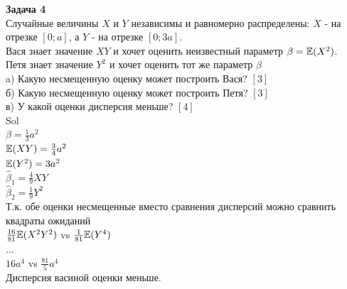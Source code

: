 \documentclass[12pt, a4paper]{article}\usepackage[]{graphicx}\usepackage[]{color}
\begin{document}
\textbf{Задача 4} \\
Случайные величины $X$ и $Y$ независимы и равномерно распределены: $X$ - на отрезке $[0;a]$, а $Y$ - на отрезке $[0;3a]$. \\
Вася знает значение $XY$ и хочет оценить неизвестный параметр $\beta=\mathbb{E}(X^{2})$. \\
Петя знает значение $Y^2$ и хочет оценить тот же параметр $\beta$ \\
a) Какую несмещенную оценку может построить Вася? $[3]$ \\
б) Какую несмещенную оценку может построить Петя? $[3]$ \\
в) У какой оценки дисперсия меньше? $[4]$ \\
Sol \\
$\beta=\frac{1}{3}a^{2}$ \\
$\mathbb{E}(XY)=\frac{3}{4}a^{2}$ \\
$\mathbb{E}(Y^{2})=3a^{2}$\\
$\hat{\beta}_{1}=\frac{4}{9}XY$ \\
$\hat{\beta}_{2}=\frac{1}{9}Y^{2}$ \\
Т.к. обе оценки несмещенные вместо сравнения дисперсий можно сравнить квадраты ожиданий \\
$\frac{16}{81}\mathbb{E}(X^{2}Y^{2})$ vs $\frac{1}{81}\mathbb{E}(Y^{4})$ \\
... \\
$16 a^4$ vs $\frac{81}{5} a^{4}$ \\
Дисперсия васиной оценки меньше. \\





\end{document}
